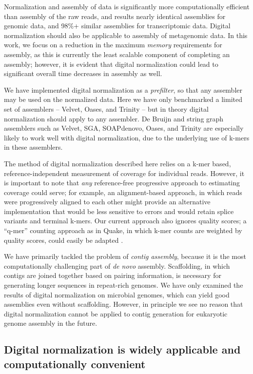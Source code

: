 \documentclass[10pt]{article}
\begin{document}
Normalization and assembly of data is significantly more
computationally efficient than assembly of the raw reads, and results
nearly identical assemblies for genomic data, and 98\%+ similar
assemblies for transcriptomic data.  Digital normalization should also
be applicable to assembly of metagenomic data.  In this work, we focus
on a reduction in the maximum {\em memory} requirements for assembly,
as this is currently the least scalable component of completing an
assembly; however, it is evident that digital normalization could lead
to significant overall time decreases in assembly as well.

We have implemented digital normalization as a {\em prefilter}, so
that any assembler may be used on the normalized data.  Here we have
only benchmarked a limited set of assemblers -- Velvet, Oases, and
Trinity -- but in theory digital normalization should apply to any
assembler.  De Bruijn and string graph assemblers such as Velvet, SGA,
SOAPdenovo, Oases, and Trinity are especially likely to work well with
digital normalization, due to the underlying use of k-mers in these
assemblers.

The method of digital normalization described here relies on a k-mer
based, reference-independent measurement of coverage for individual
reads.  However, it is important to note that {\em any} reference-free
progressive approach to estimating coverage could serve; for example,
an alignment-based approach, in which reads were progressively aligned
to each other might provide an alternative implementation that would
be less sensitive to errors and would retain splice variants and
terminal k-mers.  Our current approach also ignores quality scores; a
``q-mer'' counting approach as in Quake, in which k-mer counts are
weighted by quality scores, could easily be adapted
\cite{pubmed21114842}.

We have primarily tackled the problem of {\em contig assembly},
because it is the most computationally challenging part of {\em de
  novo} assembly.  Scaffolding, in which contigs are joined together
based on pairing information, is necessary for generating longer
sequences in repeat-rich genomes.  We have only examined the results
of digital normalization on microbial genomes, which can yield good
assemblies even without scaffolding.  However, in principle we see no
reason that digital normalization cannot be applied to contig
generation for eukaryotic genome assembly in the future.

\subsection*{Digital normalization is widely applicable and computationally convenient}
\end{document}
